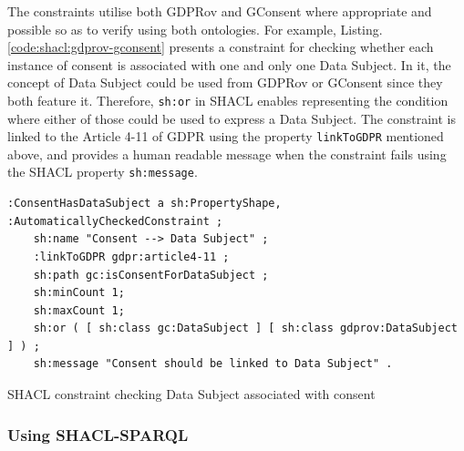 The constraints utilise both GDPRov and GConsent where appropriate and possible so as to verify using both ontologies. For example, Listing.\autoref{code:shacl:gdprov-gconsent} presents a constraint for checking whether each instance of consent is associated with one and only one Data Subject. In it, the concept of Data Subject could be used from GDPRov or GConsent since they both feature it. Therefore, \texttt{sh:or} in SHACL enables representing the condition where either of those could be used to express a Data Subject.
The constraint is linked to the Article 4-11 of GDPR using the property \texttt{linkToGDPR} mentioned above, and provides a human readable message when the constraint fails using the SHACL property \texttt{sh:message}.
\begin{listing}[htbp]
\begin{verbatim}
:ConsentHasDataSubject a sh:PropertyShape, :AutomaticallyCheckedConstraint ;
    sh:name "Consent --> Data Subject" ;
    :linkToGDPR gdpr:article4-11 ;
    sh:path gc:isConsentForDataSubject ;
    sh:minCount 1;
    sh:maxCount 1;
    sh:or ( [ sh:class gc:DataSubject ] [ sh:class gdprov:DataSubject ] ) ;
    sh:message "Consent should be linked to Data Subject" .
\end{verbatim}
\caption{SHACL constraint checking Data Subject associated with consent}
\label{code:shacl:gdprov-gconsent}
\end{listing}

\subsubsection{Using SHACL-SPARQL}

